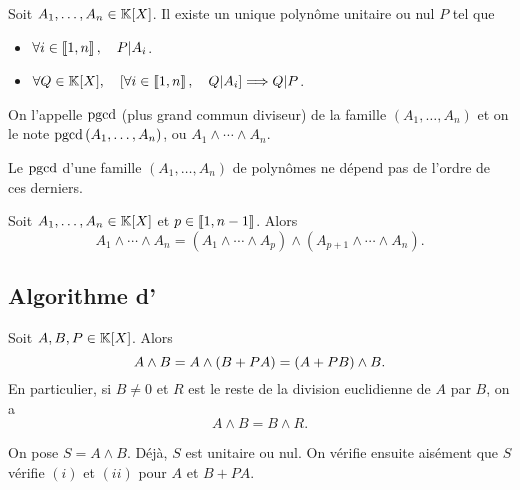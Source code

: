 \documentclass{magnolia}
\begin{document}

\begin{definition}
Soit $A_1,\ldots,A_n\in\polyK$. Il existe un unique polynôme unitaire ou nul $P$ tel que
\begin{itemize}
\item $\forall i\in\left\llbracket 1,n\right\rrbracket,\quad P|A_i$.
\item $\forall Q\in\polyK \qsep \cro{\forall i\in\intere{1}{n}\qsep Q|A_i} \implique Q|P$.
\end{itemize}
On l'appelle $\operatorname{pgcd}$ (plus grand commun diviseur) de la famille $(A_1,\ldots,A_n)$ et on le note
$\operatorname{pgcd}\left(A_1,\ldots,A_n\right)$, ou $A_1\wedge\cdots\wedge A_n$.
\end{definition}

\begin{remarqueUnique}
\remarque Le $\operatorname{pgcd}$ d'une famille $(A_1,\ldots,A_n)$ de polynômes ne dépend pas de l'ordre de
  ces derniers.
\end{remarqueUnique}

\begin{proposition}
Soit $A_1,\ldots,A_n\in\polyK$ et $p\in\left\llbracket 1,n-1\right\rrbracket$. Alors
\[A_1\wedge\cdots\wedge A_n=(A_1\wedge\cdots\wedge A_p)\wedge(A_{p+1}\wedge\cdots\wedge A_n).\]
\end{proposition}


\subsection{Algorithme d'}

\begin{proposition}
Soit $A,B,P\in\polyK$. Alors
\[A\wedge B=A\wedge\left(B+PA\right)=\left(A+PB\right)\wedge B.\]
En particulier, si $B\neq 0$ et $R$ est le reste de la division euclidienne de
$A$ par $B$, on a
\[A\wedge B=B\wedge R.\]
\end{proposition}

\begin{preuve}
On pose $S=A\wedge B$. Déjà, $S$ est unitaire ou nul. On vérifie ensuite aisément que $S$ vérifie $(i)$ et $(ii)$ pour $A$ et $B+PA$.
\end{preuve}
\end{document}
